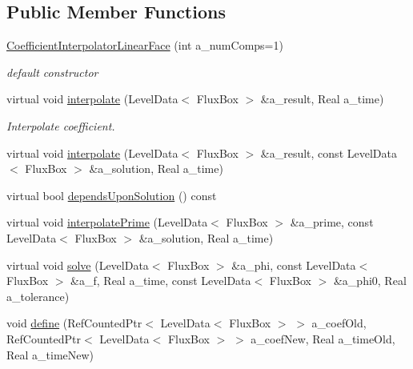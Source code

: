 \subsection*{Public Member Functions}
\begin{DoxyCompactItemize}
\item 
\hypertarget{class_coefficient_interpolator_linear_face_a64b4959fa8d8df6705df5a8baf31f3f5}{\hyperlink{class_coefficient_interpolator_linear_face_a64b4959fa8d8df6705df5a8baf31f3f5}{Coefficient\-Interpolator\-Linear\-Face} (int a\-\_\-num\-Comps=1)}\label{class_coefficient_interpolator_linear_face_a64b4959fa8d8df6705df5a8baf31f3f5}

\begin{DoxyCompactList}\small\item\em default constructor \end{DoxyCompactList}\item 
\hypertarget{class_coefficient_interpolator_linear_face_a08d5f51d4204deb361b6c8cb054cff69}{virtual void \hyperlink{class_coefficient_interpolator_linear_face_a08d5f51d4204deb361b6c8cb054cff69}{interpolate} (Level\-Data$<$ Flux\-Box $>$ \&a\-\_\-result, Real a\-\_\-time)}\label{class_coefficient_interpolator_linear_face_a08d5f51d4204deb361b6c8cb054cff69}

\begin{DoxyCompactList}\small\item\em Interpolate coefficient. \end{DoxyCompactList}\item 
virtual void \hyperlink{class_coefficient_interpolator_linear_face_a825a5def3f5da9e2a8890bd46d2af5b0}{interpolate} (Level\-Data$<$ Flux\-Box $>$ \&a\-\_\-result, const Level\-Data$<$ Flux\-Box $>$ \&a\-\_\-solution, Real a\-\_\-time)
\item 
virtual bool \hyperlink{class_coefficient_interpolator_linear_face_a233d0b610df69e882c5820610dc65f99}{depends\-Upon\-Solution} () const 
\item 
virtual void \hyperlink{class_coefficient_interpolator_linear_face_a6a9d41e8aac928cad20649644ce70aeb}{interpolate\-Prime} (Level\-Data$<$ Flux\-Box $>$ \&a\-\_\-prime, const Level\-Data$<$ Flux\-Box $>$ \&a\-\_\-solution, Real a\-\_\-time)
\item 
virtual void \hyperlink{class_coefficient_interpolator_linear_face_aa1d2b29813de7845fda24e5c523ca5b7}{solve} (Level\-Data$<$ Flux\-Box $>$ \&a\-\_\-phi, const Level\-Data$<$ Flux\-Box $>$ \&a\-\_\-f, Real a\-\_\-time, const Level\-Data$<$ Flux\-Box $>$ \&a\-\_\-phi0, Real a\-\_\-tolerance)
\item 
\hypertarget{class_coefficient_interpolator_linear_face_af27d8bed697ac3ddda5accdd37df3dee}{void \hyperlink{class_coefficient_interpolator_linear_face_af27d8bed697ac3ddda5accdd37df3dee}{define} (Ref\-Counted\-Ptr$<$ Level\-Data$<$ Flux\-Box $>$ $>$ a\-\_\-coef\-Old, Ref\-Counted\-Ptr$<$ Level\-Data$<$ Flux\-Box $>$ $>$ a\-\_\-coef\-New, Real a\-\_\-time\-Old, Real a\-\_\-time\-New)}\label{class_coefficient_interpolator_linear_face_af27d8bed697ac3ddda5accdd37df3dee}


\end{DoxyCompactItemize}
